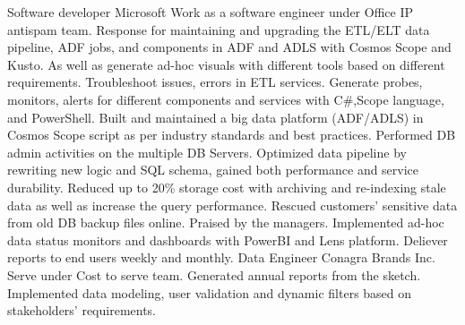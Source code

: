 \documentclass[a4paper]{ReadableCV}
\begin{document}
{}
        {Software developer}
        {Microsoft}
        {Work as a software engineer under Office IP antispam team. Response for maintaining and upgrading the ETL/ELT data pipeline, ADF jobs, and components in 
		ADF and ADLS with Cosmos Scope and Kusto. As well as generate ad-hoc visuals with different tools based on different requirements. }
{Troubleshoot issues, errors in ETL services. Generate probes, monitors, alerts for different components and services with C\#,Scope language, and PowerShell.}
{Built and maintained a big data platform (ADF/ADLS) in Cosmos Scope script as per industry standards and best practices.}
{Performed DB admin activities on the multiple DB Servers. Optimized data pipeline by rewriting new logic and SQL schema, gained both performance and service 
durability. Reduced up to 20\% storage cost with archiving and re-indexing stale data as well as increase the query performance.}
{Rescued customers' sensitive data from old DB backup files online. Praised by the managers.}
{Implemented ad-hoc data status monitors and dashboards with PowerBI and Lens platform. Deliever reports to end users weekly and monthly.}
{Data Engineer}
{Conagra Brands Inc.}
{Serve under Cost to serve team. Generated annual reports from the sketch.  Implemented data modeling, user validation and dynamic filters based on stakeholders' requirements.}
\end{document}
